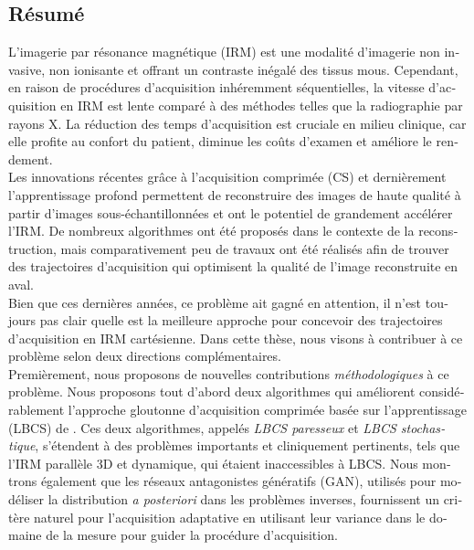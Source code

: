 \begin{otherlanguage}{french}
\cleardoublepage
\chapter*{Résumé}
L'imagerie par résonance magnétique (IRM) est une modalité d'imagerie non invasive, non ionisante et offrant un contraste inégalé des tissus mous. Cependant, en raison de procédures d'acquisition inhéremment séquentielles, la vitesse d’acquisition en IRM est  lente comparé à des méthodes telles que la radiographie par rayons X. La réduction des temps d’acquisition est cruciale en milieu clinique, car elle profite au confort du patient, diminue les coûts d'examen et améliore le rendement.\\

Les innovations récentes grâce à l’acquisition comprimée (CS) et dernièrement l'apprentissage profond permettent de reconstruire des images de haute qualité à partir d'images sous-échantillonnées et ont le potentiel de grandement accélérer l'IRM. De nombreux algorithmes ont été proposés dans le contexte de la reconstruction, mais comparativement peu de travaux ont été réalisés afin de trouver des trajectoires d'acquisition qui optimisent la qualité de l'image reconstruite en aval.\\

Bien que ces dernières années, ce problème ait gagné en attention, il n'est toujours pas clair quelle est la meilleure approche pour concevoir des trajectoires d'acquisition en IRM cartésienne. Dans cette thèse, nous visons à contribuer à ce problème selon deux directions complémentaires.\\

Premièrement, nous proposons de nouvelles contributions \textit{méthodologiques} à ce problème. Nous proposons tout d'abord deux algorithmes qui améliorent considérablement l'approche gloutonne d’acquisition comprimée basée sur l’apprentissage (LBCS) de \citep{gozcu2018learning}. Ces deux algorithmes, appelés \textit{LBCS paresseux} et \textit{LBCS stochastique}, s’étendent à des problèmes importants et cliniquement pertinents, tels que l'IRM parallèle 3D et dynamique, qui étaient inaccessibles à LBCS. Nous montrons également que les réseaux antagonistes génératifs (GAN), utilisés pour modéliser la distribution \textit{a posteriori} dans les problèmes inverses, fournissent un critère naturel pour l’acquisition adaptative en utilisant leur variance dans le domaine de la mesure pour guider la procédure d'acquisition.\\


\end{otherlanguage}
